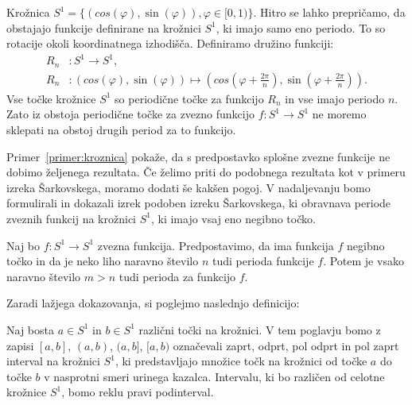 \documentclass[../TG_magistrsko_delo_sections.tex]{subfiles}
\begin{document}
\begin{primer}\label{primer:kroznica}
Krožnica $S^1 = \{ (cos(\varphi), \sin(\varphi)), \varphi \in [0, 1) \}$. Hitro se lahko prepričamo, da obstajajo funkcije definirane na krožnici $S^1$, ki imajo samo eno periodo. To so rotacije okoli koordinatnega izhodišča. Definiramo družino funkciji: 
\begin{equation*} %
\begin{split}
R_n &: S^1 \to S^1, \\ 
R_n &: (cos(\varphi), \sin(\varphi)) \mapsto (cos(\varphi + \frac{2 \pi}{n}), \sin(\varphi + \frac{2 \pi}{n})).
\end{split}
\end{equation*}
Vse točke krožnice $S^1$ so periodične točke za funkcijo $R_n$ in vse imajo periodo $n$. Zato iz obstoja periodične točke za zvezno funkcijo $f : S^1 \to S^1$ ne moremo sklepati na obstoj drugih period za to funkcijo.
\end{primer}

Primer~\ref{primer:kroznica} pokaže, da s predpostavko splošne zvezne funkcije ne dobimo željenega rezultata. Če želimo priti do podobnega rezultata kot v primeru izreka Šarkovskega, moramo dodati še kakšen pogoj. V nadaljevanju bomo formulirali in dokazali izrek podoben izreku Šarkovskega, ki obravnava periode zveznih funkcij na krožnici $S^1$, ki imajo vsaj eno negibno točko.

\begin{izrek}\label{izr:sarkovski_kroznica}
Naj bo $f : S^1 \to S^1$ zvezna funkcija. Predpostavimo, da ima funkcija $f$ negibno točko in da je neko liho naravno število $n$ tudi perioda funkcije $f$. Potem je vsako naravno število $m > n$ tudi perioda za funkcijo $f$.
\end{izrek}

Zaradi lažjega dokazovanja, si poglejmo naslednjo definicijo:
\begin{definicija}\label{def:kintervali}
Naj bosta $a \in S^1$ in $b \in S^1$ različni točki na krožnici. V tem poglavju bomo z zapisi $[a, b]$, $(a, b)$, $(a, b]$, $[a, b)$ označevali zaprt, odprt, pol odprt in pol zaprt interval na krožnici $S^1$, ki predstavljajo množice točk na krožnici od točke $a$ do točke $b$ v nasprotni smeri urinega kazalca. Intervalu, ki bo različen od celotne krožnice $S^1$, bomo reklu pravi podinterval.
\end{definicija}
\end{document}
